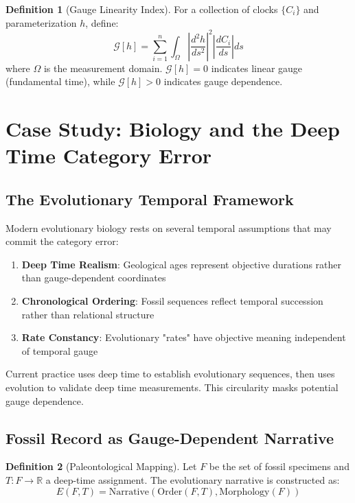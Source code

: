 \documentclass[11pt]{article}
\theoremstyle{definition}
\newtheorem{definition}{Definition}[section]
\theoremstyle{plain}
\theoremstyle{remark}
\begin{document}
\begin{definition}[Gauge Linearity Index]
For a collection of clocks $\{C_i\}$ and parameterization $h$, define:
$$\mathcal{G}[h] = \sum_{i=1}^n \int_\Omega \left|\frac{d^2h}{ds^2}\right|^2 \left|\frac{dC_i}{ds}\right| ds$$
where $\Omega$ is the measurement domain. $\mathcal{G}[h] = 0$ indicates linear gauge (fundamental time), while $\mathcal{G}[h] > 0$ indicates gauge dependence.
\end{definition}

\section{Case Study: Biology and the Deep Time Category Error}

\subsection{The Evolutionary Temporal Framework}

Modern evolutionary biology rests on several temporal assumptions that may commit the category error:

\begin{enumerate}
\item \textbf{Deep Time Realism}: Geological ages represent objective durations rather than gauge-dependent coordinates
\item \textbf{Chronological Ordering}: Fossil sequences reflect temporal succession rather than relational structure
\item \textbf{Rate Constancy}: Evolutionary "rates" have objective meaning independent of temporal gauge
\end{enumerate}

\begin{warning}
Current practice uses deep time to establish evolutionary sequences, then uses evolution to validate deep time measurements. This circularity masks potential gauge dependence.
\end{warning}

\subsection{Fossil Record as Gauge-Dependent Narrative}

\begin{definition}[Paleontological Mapping]
Let $F$ be the set of fossil specimens and $T: F \to \mathbb{R}$ a deep-time assignment. The evolutionary narrative is constructed as:
$$E(F,T) = \text{Narrative}(\text{Order}(F,T), \text{Morphology}(F))$$
\end{definition}
\end{document}
